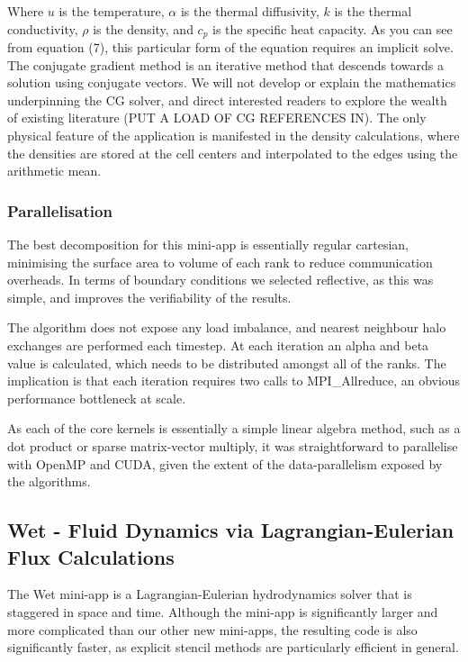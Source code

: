 \documentclass[runningheads,a4paper]{llncs}
\begin{document}
Where $u$ is the temperature, $\alpha$ is the thermal diffusivity, $k$ is the thermal conductivity, $\rho$ is the density, and $c_p$ is the specific heat capacity. As you can see from equation (7), this particular form of the equation requires an implicit solve. The conjugate gradient method is an iterative method that descends towards a solution using conjugate vectors. We will not develop or explain the mathematics underpinning the CG solver, and direct interested readers to explore the wealth of existing literature \cite{} (PUT A LOAD OF CG REFERENCES IN). The only physical feature of the application is manifested in the density calculations, where the densities are stored at the cell centers and interpolated to the edges using the arithmetic mean.

\subsubsection{Parallelisation}

The best decomposition for this mini-app is essentially regular cartesian, minimising the surface area to volume of each rank to reduce communication overheads. In terms of boundary conditions we selected reflective, as this was simple, and improves the verifiability of the results.

The algorithm does not expose any load imbalance, and nearest neighbour halo exchanges are performed each timestep. At each iteration an alpha and beta value is calculated, which needs to be distributed amongst all of the ranks. The implication is that each iteration requires two calls to MPI\_Allreduce, an obvious performance bottleneck at scale. 

As each of the core kernels is essentially a simple linear algebra method, such as a dot product or sparse matrix-vector multiply, it was straightforward to parallelise with OpenMP and CUDA, given the extent of the data-parallelism exposed by the algorithms.


\subsection{Wet - Fluid Dynamics via Lagrangian-Eulerian Flux Calculations}

\label{sec:wet}

The Wet mini-app is a Lagrangian-Eulerian hydrodynamics solver that is staggered in space and time. Although the mini-app is significantly larger and more complicated than our other new mini-apps, the resulting code is also significantly faster, as explicit stencil methods are particularly efficient in general.
\end{document}
